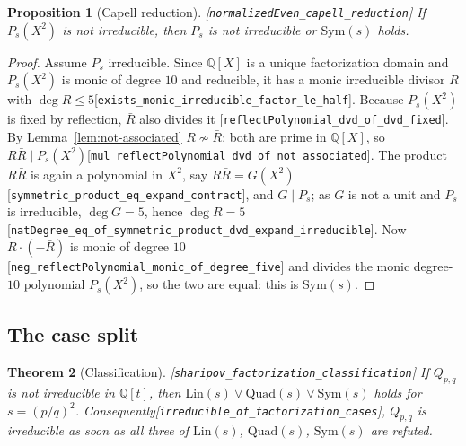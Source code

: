 \documentclass[10pt]{article}
\newtheorem{theorem}{Theorem}[section]
\newtheorem{proposition}[theorem]{Proposition}
\theoremstyle{definition}
\theoremstyle{remark}
\newcommand{\Q}{\mathbb{Q}}
\newcommand{\leanref}[1]{{\scriptsize\textup{[\texttt{#1}]}}\allowbreak}
\begin{document}
\begin{proposition}[Capell reduction]\label{prop:capell}
\leanref{normalized\allowbreak Even\_\allowbreak capell\_\allowbreak reduction}
If $P_s(X^2)$ is not irreducible, then $P_s$ is not irreducible or
$\mathrm{Sym}(s)$ holds.
\end{proposition}

\begin{proof}
Assume $P_s$ irreducible.  Since $\Q[X]$ is a unique factorization domain and
$P_s(X^2)$ is monic of degree $10$ and reducible, it has a monic irreducible
divisor $R$ with $\deg R\le5$\leanref{exists\_\allowbreak monic\_\allowbreak irreducible\_\allowbreak factor\_\allowbreak le\_\allowbreak half}.
Because $P_s(X^2)$ is fixed by reflection, $\bar R$ also divides it
\leanref{reflect\allowbreak Polynomial\_\allowbreak dvd\_\allowbreak of\_\allowbreak dvd\_\allowbreak fixed}.  By Lemma~\ref{lem:not-associated}
$R\not\sim\bar R$; both are prime in $\Q[X]$, so
$R\bar R\mid P_s(X^2)$\leanref{mul\_\allowbreak reflect\allowbreak Polynomial\_\allowbreak dvd\_\allowbreak of\_\allowbreak not\_\allowbreak associated}.
The product $R\bar R$ is again a polynomial in $X^2$, say $R\bar R=G(X^2)$
\leanref{symmetric\_\allowbreak product\_\allowbreak eq\_\allowbreak expand\_\allowbreak contract}, and $G\mid P_s$; as $G$ is not
a unit and $P_s$ is irreducible, $\deg G=5$, hence
$\deg R=5$\leanref{nat\allowbreak Degree\_\allowbreak eq\_\allowbreak of\_\allowbreak symmetric\_\allowbreak product\_\allowbreak dvd\_\allowbreak expand\_\allowbreak irreducible}.
Now $R\cdot(-\bar R)$ is monic of degree $10$
\leanref{neg\_\allowbreak reflect\allowbreak Polynomial\_\allowbreak monic\_\allowbreak of\_\allowbreak degree\_\allowbreak five} and divides the monic
degree-$10$ polynomial $P_s(X^2)$, so the two are equal: this is $\mathrm{Sym}(s)$.
\end{proof}

\subsection{The case split}

\begin{theorem}[Classification]\label{thm:classification}
\leanref{sharipov\_\allowbreak factorization\_\allowbreak classification}
If $Q_{p,q}$ is not irreducible in $\Q[t]$, then
$\mathrm{Lin}(s)\vee\mathrm{Quad}(s)\vee\mathrm{Sym}(s)$ holds for $s=(p/q)^2$.
Consequently\leanref{irreducible\_\allowbreak of\_\allowbreak factorization\_\allowbreak cases},
$Q_{p,q}$ is irreducible as soon as all three of
$\mathrm{Lin}(s)$, $\mathrm{Quad}(s)$, $\mathrm{Sym}(s)$ are refuted.
\end{theorem}
\end{document}
